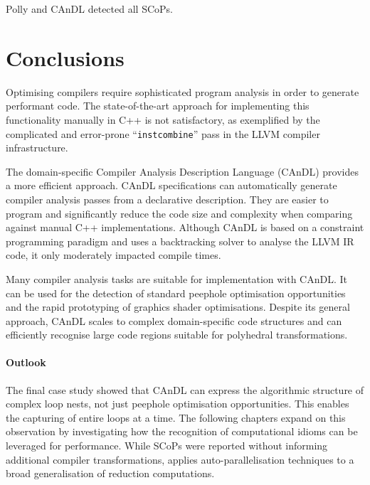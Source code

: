 \begin{table}[ht]
    
    \caption{Polly and CAnDL detected all SCoPs.}
    \label{fig:candlvspolly}
\end{table}

\section{Conclusions}

    Optimising compilers require sophisticated program analysis in order to
    generate performant code.
    The state-of-the-art approach for implementing this functionality manually
    in C++ is not satisfactory, as exemplified by the complicated and
    error-prone ``{\tt instcombine}'' pass in the LLVM compiler infrastructure.

    The domain-specific Compiler Analysis Description Language (CAnDL) provides
    a more efficient approach.
    CAnDL specifications can automatically generate compiler analysis
    passes from a declarative description.
    They are easier to program and significantly reduce the code size and
    complexity when comparing against manual C++ implementations.
    Although CAnDL is based on a constraint programming paradigm and uses a
    backtracking solver to analyse the LLVM IR code, it only moderately impacted
    compile times.

    Many compiler analysis tasks are suitable for implementation with CAnDL.
    It can be used for the detection of standard peephole optimisation
    opportunities and the rapid prototyping of graphics shader optimisations.
    Despite its general approach, CAnDL scales to complex domain-specific code
    structures and can efficiently recognise large code regions suitable for
    polyhedral transformations.

    \paragraph*{Outlook}
    The final case study showed that CAnDL can express the algorithmic structure
    of complex loop nests, not just peephole optimisation
    opportunities.
    This enables the capturing of entire loops at a time.
    The following chapters expand on this observation by investigating how the
    recognition of computational idioms can be leveraged for performance.
    While SCoPs were reported without informing additional compiler
    transformations,  applies auto-parallelisation
    techniques to a broad generalisation of reduction computations.
